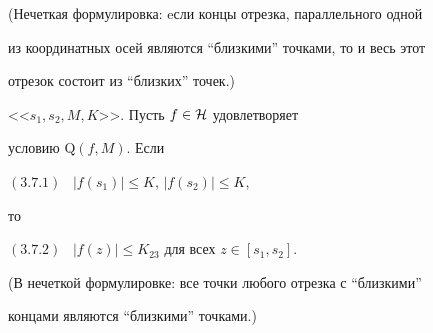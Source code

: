 (Нечеткая формулировка: eсли концы отрезка, параллельного одной 


из координатных осей являются ``близкими'' точками, то и весь этот 


отрезок состоит из ``близких'' точек.)





\begin{lems}


<<$s_1, s_2, M, K$>>. Пусть $f\in {\cal H}$ удовлетворяет 


условию $\mathrm Q(f,M)$. Если 





$(3.7.1)$ \ $|f(s_1)|\leq K$, $|f(s_2)|\leq K$, 





\noindent{}то





$(3.7.2)$ \ $|f(z)|\leq K_{23}$ для всех $z\in [s_1, s_2]$.


\end{lems}





(В нечеткой формулировке: все точки любого отрезка с ``близкими''


концами являются ``близкими'' точками.)





